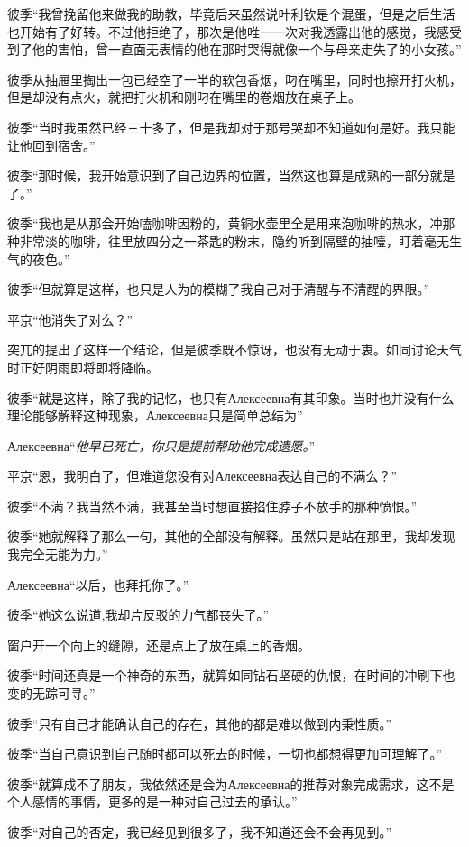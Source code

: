 \documentclass{article}
\begin{document}
彼季“我曾挽留他来做我的助教，毕竟后来虽然说叶利钦是个混蛋，但是之后生活也开始有了好转。不过他拒绝了，那次是他唯一一次对我透露出他的感觉，我感受到了他的害怕，曾一直面无表情的他在那时哭得就像一个与母亲走失了的小女孩。”

彼季从抽屉里掏出一包已经空了一半的软包香烟，叼在嘴里，同时也擦开打火机，但是却没有点火，就把打火机和刚叼在嘴里的卷烟放在桌子上。

彼季“当时我虽然已经三十多了，但是我却对于那号哭却不知道如何是好。我只能让他回到宿舍。”

彼季“那时候，我开始意识到了自己边界的位置，当然这也算是成熟的一部分就是了。”

彼季“我也是从那会开始嗑咖啡因粉的，黄铜水壶里全是用来泡咖啡的热水，冲那种非常淡的咖啡，往里放四分之一茶匙的粉末，隐约听到隔壁的抽噎，盯着毫无生气的夜色。”

彼季“但就算是这样，也只是人为的模糊了我自己对于清醒与不清醒的界限。”

平京“他消失了对么？”

突兀的提出了这样一个结论，但是彼季既不惊讶，也没有无动于衷。如同讨论天气时正好阴雨即将即将降临。

彼季“就是这样，除了我的记忆，也只有Алексеевна有其印象。当时也并没有什么理论能够解释这种现象，Алексеевна只是简单总结为”

Алексеевна“\textit{他早已死亡，你只是提前帮助他完成遗愿。}”

平京“恩，我明白了，但难道您没有对Алексеевна表达自己的不满么？”

彼季“不满？我当然不满，我甚至当时想直接掐住脖子不放手的那种愤恨。”

彼季“她就解释了那么一句，其他的全部没有解释。虽然只是站在那里，我却发现我完全无能为力。”

Алексеевна“以后，也拜托你了。”

彼季“她这么说道,我却片反驳的力气都丧失了。”

窗户开一个向上的缝隙，还是点上了放在桌上的香烟。

彼季“时间还真是一个神奇的东西，就算如同钻石坚硬的仇恨，在时间的冲刷下也变的无踪可寻。”

彼季“只有自己才能确认自己的存在，其他的都是难以做到内秉性质。”

彼季“当自己意识到自己随时都可以死去的时候，一切也都想得更加可理解了。”

彼季“就算成不了朋友，我依然还是会为Алексеевна的推荐对象完成需求，这不是个人感情的事情，更多的是一种对自己过去的承认。”

彼季“对自己的否定，我已经见到很多了，我不知道还会不会再见到。”
\end{document}
